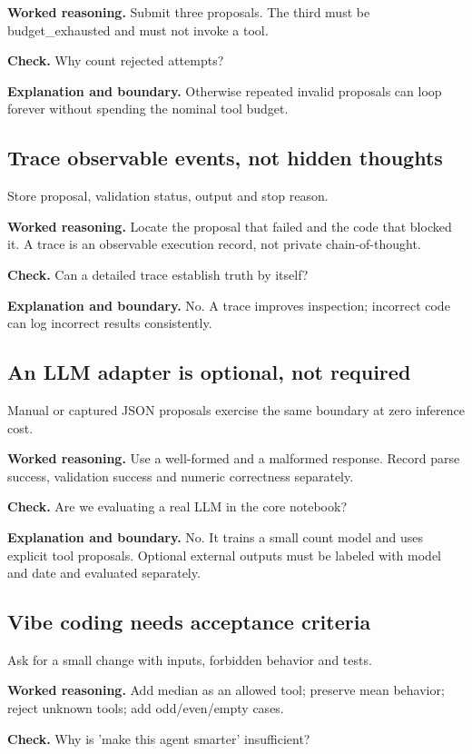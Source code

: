 \textbf{Worked reasoning.} Submit three proposals. The third must be budget\_exhausted and must not invoke a tool.

\textbf{Check.} Why count rejected attempts?

\textbf{Explanation and boundary.} Otherwise repeated invalid proposals can loop forever without spending the nominal tool budget.

\subsection{Trace observable events, not hidden thoughts}
Store proposal, validation status, output and stop reason.

\textbf{Worked reasoning.} Locate the proposal that failed and the code that blocked it. A trace is an observable execution record, not private chain-of-thought.

\textbf{Check.} Can a detailed trace establish truth by itself?

\textbf{Explanation and boundary.} No. A trace improves inspection; incorrect code can log incorrect results consistently.

\subsection{An LLM adapter is optional, not required}
Manual or captured JSON proposals exercise the same boundary at zero inference cost.

\textbf{Worked reasoning.} Use a well-formed and a malformed response. Record parse success, validation success and numeric correctness separately.

\textbf{Check.} Are we evaluating a real LLM in the core notebook?

\textbf{Explanation and boundary.} No. It trains a small count model and uses explicit tool proposals. Optional external outputs must be labeled with model and date and evaluated separately.

\subsection{Vibe coding needs acceptance criteria}
Ask for a small change with inputs, forbidden behavior and tests.

\textbf{Worked reasoning.} Add median as an allowed tool; preserve mean behavior; reject unknown tools; add odd/even/empty cases.

\textbf{Check.} Why is 'make this agent smarter' insufficient?

